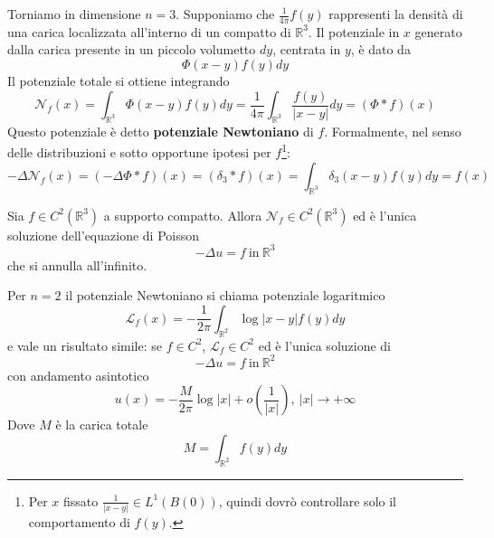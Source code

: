 \documentclass[10pt,a4paper,twoside,openright]{book}
\begin{document}
Torniamo in dimensione $\displaystyle n=3$. Supponiamo che $\displaystyle \frac{1}{4\pi } f(y)$ rappresenti la densità di una carica localizzata all'interno di un compatto di $\displaystyle \mathbb{R}^{3}$. Il potenziale in $\displaystyle x$ generato dalla carica presente in un piccolo volumetto $\displaystyle dy$, centrata in $\displaystyle y$, è dato da
\begin{equation*}
	\Phi (x-y) f(y) dy
\end{equation*}
Il potenziale totale si ottiene integrando
\begin{equation*}
	\mathcal{N}_{f}(x) =\int _{\mathbb{R}^{3}} \Phi (x-y) f(y) dy=\frac{1}{4\pi }\int _{\mathbb{R}^{3}}\frac{f(y)}{| x-y| } dy=(\Phi \ast f)(x)
\end{equation*}
Questo potenziale è detto \textbf{potenziale Newtoniano} di $\displaystyle f$. Formalmente, nel senso delle distribuzioni e sotto opportune ipotesi per $\displaystyle f$\footnote{Per $\displaystyle x$ fissato $\displaystyle \frac{1}{| x-y| } \in L^{1}(B(0))$, quindi dovrò controllare solo il comportamento di $\displaystyle f(y)$.}:
\begin{equation*}
	-\Delta \mathcal{N}_{f}(x) =( -\Delta \Phi \ast f)(x) =( \delta _{3} \ast f)(x) =\int _{\mathbb{R}^{3}} \delta _{3}(x-y) f(y) dy=f(x)
\end{equation*}
\begin{theorem}
	Sia $\displaystyle f\in C^{2}\left(\mathbb{R}^{3}\right)$ a supporto compatto. Allora $\displaystyle \mathcal{N}_{f} \in C^{2}\left(\mathbb{R}^{3}\right)$ ed è l'unica soluzione dell'equazione di Poisson
	\begin{equation*}
		-\Delta u=f\ \text{in} \ \mathbb{R}^{3}
	\end{equation*}
	che si annulla all'infinito.
\end{theorem}
\begin{nb}
	Per $\displaystyle n=2$ il potenziale Newtoniano si chiama potenziale logaritmico
	\begin{equation*}
		\mathcal{L}_{f}(x) =-\frac{1}{2\pi }\int _{\mathbb{R}^{2}}\log| x-y| f(y) dy
	\end{equation*}
	e vale un risultato simile: se $\displaystyle f\in C^{2}$, $\displaystyle \mathcal{L}_{f} \in C^{2}$ ed è l'unica soluzione di 
	\begin{equation*}
		-\Delta u=f\ \text{in} \ \mathbb{R}^{2}
	\end{equation*}
	con andamento asintotico
	\begin{equation*}
		u(x) =-\frac{M}{2\pi }\log| x| +o\left(\frac{1}{| x| }\right),\ | x| \rightarrow +\infty 
	\end{equation*}
	Dove $\displaystyle M$ è la carica totale
	\begin{equation*}
		M=\int _{\mathbb{R}^{2}} f(y) dy
	\end{equation*}
\end{nb}
\end{document}
